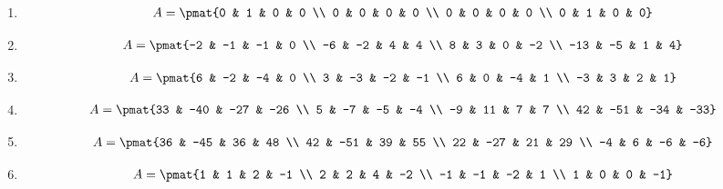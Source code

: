 \begin{enumerate}
\item

\begin{align*}
A = \pmat{0 & 1 & 0 & 0 \\ 0 & 0 & 0 & 0 \\ 0 & 0 & 0 & 0 \\ 0 & 1 & 0 & 0}
\end{align*}

\item

\begin{align*}
A = \pmat{-2 & -1 & -1 & 0 \\ -6 & -2 & 4 & 4 \\ 8 & 3 & 0 & -2 \\ -13 & -5 & 1 & 4}
\end{align*}

\item

\begin{align*}
A = \pmat{6 & -2 & -4 & 0 \\ 3 & -3 & -2 & -1 \\ 6 & 0 & -4 & 1 \\ -3 & 3 & 2 & 1}
\end{align*}

\item

\begin{align*}
A = \pmat{33 & -40 & -27 & -26 \\ 5 & -7 & -5 & -4 \\ -9 & 11 & 7 & 7 \\ 42 & -51 & -34 & -33}
\end{align*}

\item

\begin{align*}
A = \pmat{36 & -45 & 36 & 48 \\ 42 & -51 & 39 & 55 \\ 22 & -27 & 21 & 29 \\ -4 & 6 & -6 & -6}
\end{align*}

\item

\begin{align*}
A = \pmat{1 & 1 & 2 & -1 \\ 2 & 2 & 4 & -2 \\ -1 & -1 & -2 & 1 \\ 1 & 0 & 0 & -1}
\end{align*}


\end{enumerate}
